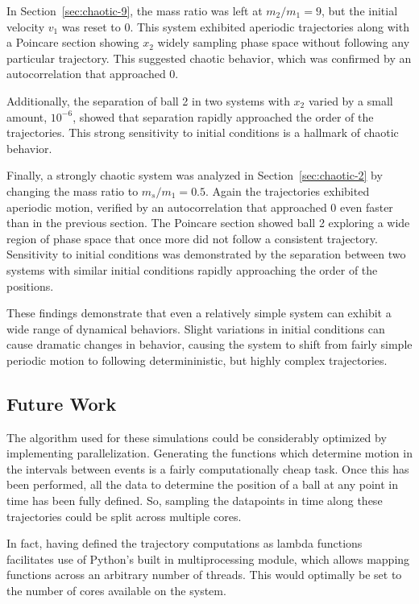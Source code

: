 \documentclass[pra,twocolumn,showpacs,amsmath,amssymb, aps, 10pt]{revtex4-1}
\begin{document}
In Section~\ref{sec:chaotic-9}, the mass ratio was left at $m_2/m_1=9$, but the
initial velocity $v_1$ was reset to $0$. This system exhibited aperiodic trajectories
along with a Poincare section showing $x_2$ widely sampling phase space without
following any particular trajectory. This suggested chaotic behavior, which was
confirmed by an autocorrelation that approached 0.

Additionally, the separation
of ball 2 in two systems with $x_2$ varied by a small amount, $10^{-6}$, showed
that separation rapidly approached the order of the trajectories.
This strong sensitivity to initial conditions is a hallmark of chaotic behavior.

Finally, a strongly chaotic system was analyzed in Section~\ref{sec:chaotic-2}
by changing the mass ratio to $m_s/m_1=0.5$. Again the trajectories exhibited
aperiodic motion, verified by an autocorrelation that approached 0 even faster
than in the previous section. The Poincare section showed ball 2 exploring a wide
region of phase space that once more did not follow a consistent trajectory.
Sensitivity to initial conditions was demonstrated by the separation between two
systems with similar initial conditions rapidly approaching the order of the positions.

These findings demonstrate that even a relatively simple system can exhibit a wide
range of dynamical behaviors. Slight variations in initial conditions can cause
dramatic changes in behavior, causing the system to shift from fairly simple
periodic motion to following determininistic, but highly complex trajectories.

\subsection{Future Work}

The algorithm used for these simulations could be considerably optimized by
implementing parallelization. Generating the functions which determine motion in
the intervals between events is a fairly computationally cheap task. Once this
has been performed, all the data to determine the position of a ball at any point
in time has been fully defined. So, sampling the datapoints in time along these
trajectories could be split across multiple cores.

In fact, having defined the
trajectory computations as lambda functions facilitates use of Python's built in
multiprocessing module, which allows mapping functions across an arbitrary number
of threads. This would optimally be set to the number of cores available on the
system.
\end{document}
